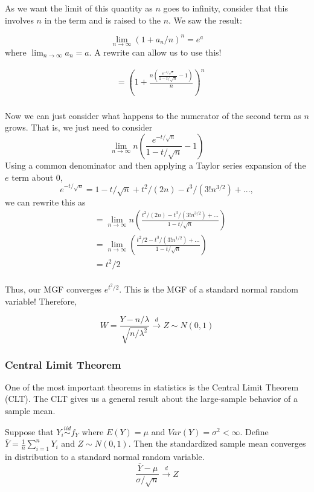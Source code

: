 \documentclass[
]{article}
\providecommand{\tightlist}{%
  \setlength{\itemsep}{0pt}\setlength{\parskip}{0pt}}
\begin{document}
As we want the limit of this quantity as \(n\) goes to infinity,
consider that this involves \(n\) in the term and is raised to the
\(n\). We saw the result:

\[\lim_{n\rightarrow\infty}(1+a_n/n)^n=e^a\] where
\(\lim_{n\rightarrow\infty}a_n=a\). A rewrite can allow us to use this!

\begin{align*}
      &= \left(1+\frac{n\left(\frac{e^{-t/\sqrt{n}}}{1-t/\sqrt{n}}-1\right)}{n}\right)^{n}\\
\end{align*}

Now we can just consider what happens to the numerator of the second
term as \(n\) grows. That is, we just need to consider
\[\lim_{n\rightarrow\infty}n\left(\frac{e^{-t/\sqrt{n}}}{1-t/\sqrt{n}}-1\right)\]
Using a common denominator and then applying a Taylor series expansion
of the \(e\) term about 0,
\[e^{-t/\sqrt{n}}=1-t/\sqrt{n}+t^2/(2n)-t^3/(3!n^{3/2})+...,\] we can
rewrite this as \begin{align*}
    &= \lim_{n\rightarrow\infty}n\left(\frac{t^2/(2n)-t^3/(3!n^{3/2})+...}{1-t/\sqrt{n}}\right)\\
    &= \lim_{n\rightarrow\infty}\left(\frac{t^2/2-t^3/(3!n^{1/2})+...}{1-t/\sqrt{n}}\right)\\
    &= t^2/2\\
\end{align*}

Thus, our MGF converges \(e^{t^2/2}\). This is the MGF of a standard
normal random variable! Therefore,

\[W = \frac{Y-n/\lambda}{\sqrt{n/\lambda^2}}\stackrel{d}{\rightarrow} Z \sim N(0,1)\]

\hypertarget{central-limit-theorem}{%
\subsubsection{Central Limit Theorem}\label{central-limit-theorem}}

One of the most important theorems in statistics is the Central Limit
Theorem (CLT). The CLT gives us a general result about the large-sample
behavior of a sample mean.

\begin{description}
\tightlist
\item[Central Limit Theorem (CLT)]
Suppose that \(Y_i\stackrel{iid}\sim f_Y\) where \(E(Y)=\mu\) and
\(Var(Y)=\sigma^2 < \infty\). Define
\(\bar{Y}=\frac{1}{n} \sum_{i=1}^{n} Y_i\) and \(Z \sim N(0, 1)\). Then
the standardized sample mean converges in distribution to a standard
normal random variable.
\[\frac{\bar{Y}-\mu}{\sigma/\sqrt{n}} \stackrel {d} {\rightarrow} Z\]
\end{description}
\end{document}
